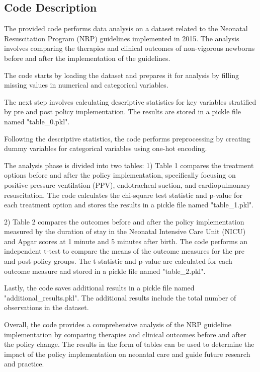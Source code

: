 \documentclass[11pt]{article}
\begin{document}
\subsection{Code Description}

The provided code performs data analysis on a dataset related to the Neonatal Resuscitation Program (NRP) guidelines implemented in 2015. The analysis involves comparing the therapies and clinical outcomes of non-vigorous newborns before and after the implementation of the guidelines. 

The code starts by loading the dataset and prepares it for analysis by filling missing values in numerical and categorical variables. 

The next step involves calculating descriptive statistics for key variables stratified by pre and post policy implementation. The results are stored in a pickle file named "table\_0.pkl".

Following the descriptive statistics, the code performs preprocessing by creating dummy variables for categorical variables using one-hot encoding.

The analysis phase is divided into two tables: 
1) Table 1 compares the treatment options before and after the policy implementation, specifically focusing on positive pressure ventilation (PPV), endotracheal suction, and cardiopulmonary resuscitation. The code calculates the chi-square test statistic and p-value for each treatment option and stores the results in a pickle file named "table\_1.pkl".

2) Table 2 compares the outcomes before and after the policy implementation measured by the duration of stay in the Neonatal Intensive Care Unit (NICU) and Apgar scores at 1 minute and 5 minutes after birth. The code performs an independent t-test to compare the means of the outcome measures for the pre and post-policy groups. The t-statistic and p-value are calculated for each outcome measure and stored in a pickle file named "table\_2.pkl".

Lastly, the code saves additional results in a pickle file named "additional\_results.pkl". The additional results include the total number of observations in the dataset.

Overall, the code provides a comprehensive analysis of the NRP guideline implementation by comparing therapies and clinical outcomes before and after the policy change. The results in the form of tables can be used to determine the impact of the policy implementation on neonatal care and guide future research and practice.
\end{document}
